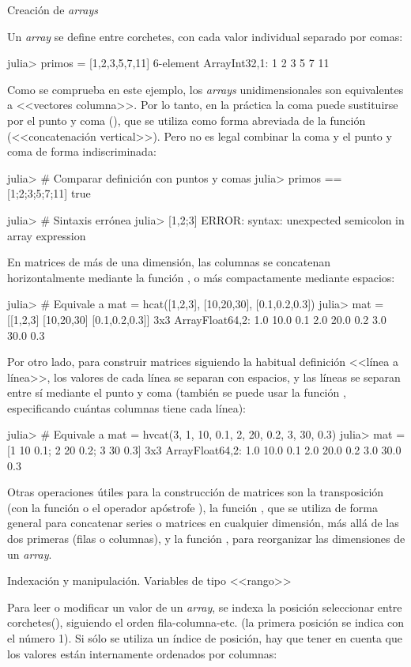 ﻿\documentclass[spanish]{article}
\begin{document}
Creación de \emph{arrays}

Un \emph{array} se define entre corchetes, con cada valor individual
separado por comas:

julia> primos = [1,2,3,5,7,11]
6-element Array{Int32,1}:
 1
 2
 3
 5
 7
 11

Como se comprueba en este ejemplo, los \emph{arrays} unidimensionales
son equivalentes a <<vectores columna>>. Por lo tanto, en la práctica
la coma puede sustituirse por el punto y coma (\codet{;}), que
se utiliza como forma abreviada de la función  (<<concatenación
vertical>>). Pero no es legal combinar la coma y el punto y coma
de forma indiscriminada:

julia> # Comparar definición con puntos y comas
julia> primos == [1;2;3;5;7;11]
true

julia> # Sintaxis errónea
julia> [1,2;3]
ERROR: syntax: unexpected semicolon in array expression

En matrices de más de una dimensión, las columnas se concatenan horizontalmente
mediante la función , o más compactamente mediante espacios:

julia> # Equivale a mat = hcat([1,2,3], [10,20,30], [0.1,0.2,0.3])
julia> mat = [[1,2,3] [10,20,30] [0.1,0.2,0.3]]
3x3 Array{Float64,2}:
 1.0 10.0 0.1
 2.0 20.0 0.2
 3.0 30.0 0.3

Por otro lado, para construir matrices siguiendo la habitual definición
<<línea a línea>>, los valores de cada línea se separan con espacios,
y las líneas se separan entre sí mediante el punto y coma (también
se puede usar la función , especificando cuántas columnas
tiene cada línea):

julia> # Equivale a mat = hvcat(3, 1, 10, 0.1, 2, 20, 0.2, 3, 30, 0.3)
julia> mat = [1 10 0.1; 2 20 0.2; 3 30 0.3]
3x3 Array{Float64,2}:
 1.0 10.0 0.1
 2.0 20.0 0.2
 3.0 30.0 0.3

Otras operaciones útiles para la construcción de matrices son la transposición
(con la función  o el operador apóstrofe ),
la función , que se utiliza de forma general para concatenar
series o matrices en cualquier dimensión, más allá de las dos primeras
(filas o columnas), y la función , para reorganizar
las dimensiones de un \emph{array}.

Indexación y manipulación. Variables de tipo <<rango>>

Para leer o modificar un valor de un \emph{array}, se indexa la posición
seleccionar entre corchetes(\code{[]}), siguiendo el orden fila-columna-etc.
(la primera posición se indica con el número 1). Si sólo se utiliza
un índice de posición, hay que tener en cuenta que los valores están
internamente ordenados por columnas:
\end{document}
